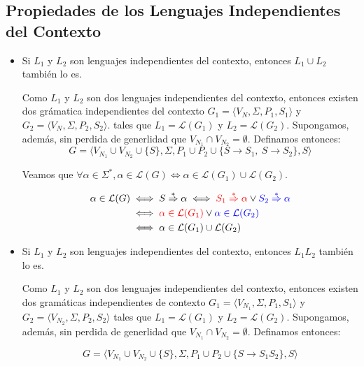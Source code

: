 \subsection{Propiedades de los Lenguajes Independientes del Contexto}
\begin{itemize}
  \item Si \(L_1\) y \(L_2\) son lenguajes independientes del contexto, entonces \(L_1 \cup L_2\) también lo es.
        \begin{demo}[0.8\textwidth]
          Como \(L_1\) y \(L_2\) son dos lenguajes independientes del contexto, entonces existen dos grámatica independientes del contexto \(G_1=\langle V_N, \Sigma, P_1, S_1 \rangle\) y \(G_2=\langle V_N, \Sigma, P_2, S_2 \rangle\). tales que \(L_1 = \mathcal{L}(G_1)\) y \(L_2 = \mathcal{L}(G_2)\). Supongamos, además, sin perdida de generlidad que \(V_{N_1}\cap V_{N_2} = \emptyset\). Definamos entonces:
          \[ G = \langle V_{N_1} \cup V_{N_2} \cup \{S\}, \Sigma, P_1 \cup P_2 \cup \{ S \to S_1,~S\to S_2\}, S \rangle \]

          Veamos que \(\forall\alpha\in\Sigma^*, \alpha\in\mathcal{L}(G) \iff \alpha\in\mathcal{L}(G_1) \cup \mathcal{L}(G_2)\).

          \begin{align*}
            \alpha\in\mathcal{L}(G) & \iff S\overset{*}{\Rightarrow}\alpha \iff {\color{red}S_1 \overset{*}{\Rightarrow}\alpha} \lor {\color{blue}S_2\overset{*}{\Rightarrow}\alpha} \\
                                    & \iff {\color{red}\alpha\in\mathcal{L}(G_1)} \lor {\color{blue}\alpha\in\mathcal{L}(G_2)}      \\
                                    & \iff \alpha\in\mathcal{L}(G_1) \cup \mathcal{L}(G_2)
          \end{align*}
        \end{demo}
  \item Si \(L_1\) y \(L_2\) son lenguajes independientes del contexto, entonces \(L_1L_2\) también lo es.
        \begin{demo}[0.8\textwidth]
          Como \(L_1\) y \(L_2\) son dos lenguajes independientes del contexto, entonces existen dos gramáticas independientes de contexto \(G_1=\langle V_{N_1}, \Sigma, P_1, S_1 \rangle\) y \(G_2=\langle V_{N_2}, \Sigma, P_2, S_2 \rangle\) tales que \(L_1 = \mathcal{L}(G_1)\) y \(L_2 = \mathcal{L}(G_2)\). Supongamos, además, sin perdida de generlidad que \(V_{N_1}\cap V_{N_2} = \emptyset\). Definamos entonces:
        \end{demo}
        \begin{demoPart}[0.8\textwidth]
          \[ G = \langle V_{N_1} \cup V_{N_2} \cup \{S\}, \Sigma, P_1 \cup P_2 \cup \{ S \to S_1S_2\}, S \rangle \]


\end{demoPart}
\end{itemize}
